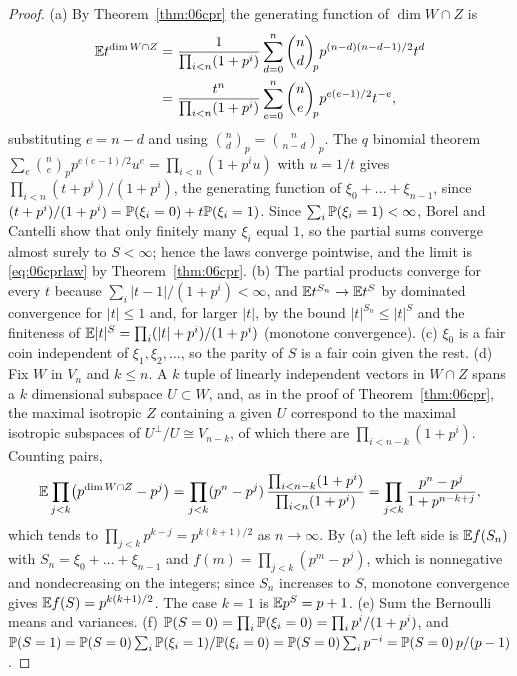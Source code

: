 \begin{proof}
(a) By Theorem~\ref{thm:06cpr} the generating function of $\dim W\cap Z$ is
\[
\begin{aligned}
\mathbb{E} t^{\dim W\cap Z} &= \frac{1}{\prod_{i<n}(1+p^i)}\sum_{d=0}^n\binom nd_{\!p}p^{(n-d)(n-d-1)/2}t^d\\
&= \frac{t^n}{\prod_{i<n}(1+p^i)}\sum_{e=0}^n\binom ne_{\!p}p^{e(e-1)/2}t^{-e},
\end{aligned}
\]
substituting $e = n-d$ and using $\binom nd_p = \binom n{n-d}_p$. The $q$ binomial theorem $\sum_e\binom ne_pp^{e(e-1)/2}u^e = \prod_{i<n}(1+p^iu)$ with $u = 1/t$ gives $\prod_{i<n}(t+p^i)/(1+p^i)$, the generating function of $\xi_0+\dots+\xi_{n-1}$, since $(t+p^i)/(1+p^i) = \mathbb{P}(\xi_i = 0)+t\mathbb{P}(\xi_i = 1)$. Since $\sum_i\mathbb{P}(\xi_i = 1)<\infty$, Borel and Cantelli show that only finitely many $\xi_i$ equal $1$, so the partial sums converge almost surely to $S<\infty$; hence the laws converge pointwise, and the limit is \eqref{eq:06cprlaw} by Theorem~\ref{thm:06cpr}. (b) The partial products converge for every $t$ because $\sum_i|t-1|/(1+p^i)<\infty$, and $\mathbb{E} t^{S_n}\to\mathbb{E} t^S$ by dominated convergence for $|t|\le1$ and, for larger $|t|$, by the bound $|t|^{S_n}\le|t|^S$ and the finiteness of $\mathbb{E}|t|^S = \prod_i(|t|+p^i)/(1+p^i)$ (monotone convergence). (c) $\xi_0$ is a fair coin independent of $\xi_1,\xi_2,\dots$, so the parity of $S$ is a fair coin given the rest. (d) Fix $W$ in $V_n$ and $k\le n$. A $k$ tuple of linearly independent vectors in $W\cap Z$ spans a $k$ dimensional subspace $U\subset W$, and, as in the proof of Theorem~\ref{thm:06cpr}, the maximal isotropic $Z$ containing a given $U$ correspond to the maximal isotropic subspaces of $U^\perp/U\cong V_{n-k}$, of which there are $\prod_{i<n-k}(1+p^i)$. Counting pairs,
\[
\mathbb{E}\prod_{j<k}\bigl(p^{\dim W\cap Z}-p^j\bigr) = \prod_{j<k}(p^n-p^j)\,\frac{\prod_{i<n-k}(1+p^i)}{\prod_{i<n}(1+p^i)} = \prod_{j<k}\frac{p^n-p^j}{1+p^{n-k+j}} ,
\]
which tends to $\prod_{j<k}p^{k-j} = p^{k(k+1)/2}$ as $n\to\infty$. By (a) the left side is $\mathbb{E} f(S_n)$ with $S_n = \xi_0+\dots+\xi_{n-1}$ and $f(m) = \prod_{j<k}(p^m-p^j)$, which is nonnegative and nondecreasing on the integers; since $S_n$ increases to $S$, monotone convergence gives $\mathbb{E} f(S) = p^{k(k+1)/2}$. The case $k = 1$ is $\mathbb{E} p^S = p+1$. (e) Sum the Bernoulli means and variances. (f) $\mathbb{P}(S = 0) = \prod_i\mathbb{P}(\xi_i = 0) = \prod_ip^i/(1+p^i)$, and $\mathbb{P}(S = 1) = \mathbb{P}(S = 0)\sum_i\mathbb{P}(\xi_i = 1)/\mathbb{P}(\xi_i = 0) = \mathbb{P}(S = 0)\sum_ip^{-i} = \mathbb{P}(S = 0)\,p/(p-1)$.
\end{proof}

